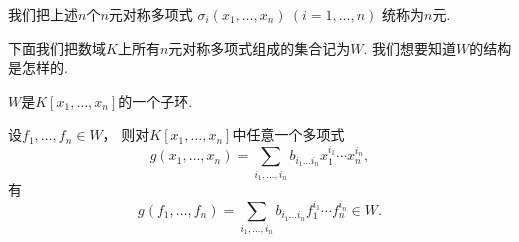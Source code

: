 我们把上述\(n\)个\(n\)元对称多项式
\(\sigma_i(x_1,\dotsc,x_n)\ (i=1,\dotsc,n)\)
统称为\(n\)元.

下面我们把数域\(K\)上所有\(n\)元对称多项式组成的集合记为\(W\).
我们想要知道\(W\)的结构是怎样的.

\begin{proposition}
\(W\)是\(K[x_1,\dotsc,x_n]\)的一个子环.
\end{proposition}

\begin{proposition}
设\(f_1,\dotsc,f_n \in W\)，
则对\(K[x_1,\dotsc,x_n]\)中任意一个多项式\[
	g(x_1,\dotsc,x_n)
	=\sum_{i_1,\dotsc,i_n}
	b_{i_1 \dotso i_n}
	x_1^{i_1} \dotsm x_n^{i_n},
\]
有\[
	g(f_1,\dotsc,f_n)
	=\sum_{i_1,\dotsc,i_n}
	b_{i_1 \dotso i_n}
	f_1^{i_1} \dotsm f_n^{i_n}
	\in W.
\]
\end{proposition}
